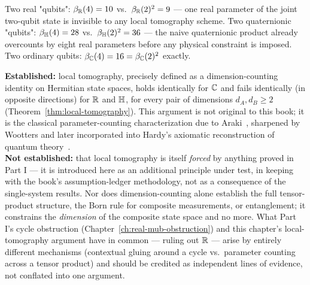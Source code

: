 \begin{example}[$d_A=d_B=2$]
Two real "qubits": $\beta_{\mathbb{R}}(4)=10$ vs.\ $\beta_{\mathbb{R}}(2)^2=9$ — one real parameter
of the joint two-qubit state is invisible to any local tomography scheme.
Two quaternionic "qubits": $\beta_{\mathbb{H}}(4)=28$ vs.\ $\beta_{\mathbb{H}}(2)^2=36$ — the
naive quaternionic product already overcounts by eight real parameters before
any physical constraint is imposed. Two ordinary qubits: $\beta_{\mathbb{C}}(4)=16 =
\beta_{\mathbb{C}}(2)^2$ exactly.
\end{example}

\begin{ledgerentry}
\textbf{Established:} local tomography, precisely defined as a
dimension-counting identity on Hermitian state spaces, holds identically for
$\mathbb{C}$ and fails identically (in opposite directions) for $\mathbb{R}$ and $\mathbb{H}$, for
every pair of dimensions $d_A,d_B \ge 2$
(Theorem~\ref{thm:local-tomography}). This argument is not original to this
book; it is the classical parameter-counting characterization due to
Araki~\cite{araki1980}, sharpened by Wootters and later incorporated into
Hardy's axiomatic reconstruction of quantum theory~\cite{hardy2001}.\\
\textbf{Not established:} that local tomography is itself \emph{forced} by
anything proved in Part I — it is introduced here as an additional principle
under test, in keeping with the book's assumption-ledger methodology, not as
a consequence of the single-system results. Nor does dimension-counting alone
establish the full tensor-product structure, the Born rule for composite
measurements, or entanglement; it constrains the \emph{dimension} of the
composite state space and no more. What Part I's cycle obstruction
(Chapter~\ref{ch:real-mub-obstruction}) and this chapter's local-tomography
argument have in common — ruling out $\mathbb{R}$ — arise by entirely different
mechanisms (contextual gluing around a cycle vs.\ parameter counting across a
tensor product) and should be credited as independent lines of evidence, not
conflated into one argument.
\end{ledgerentry}
